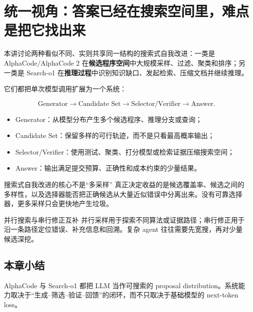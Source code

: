 \section{统一视角：答案已经在搜索空间里，难点是把它找出来}

本讲讨论两种看似不同、实则共享同一结构的搜索式自我改进：一类是 AlphaCode/AlphaCode 2 在\textbf{候选程序空间}中大规模采样、过滤、聚类和排序；另一类是 Search-o1 在\textbf{推理过程}中识别知识缺口、发起检索、压缩文档并继续推理。

它们都把单次模型调用扩展为一个系统：

$$
\text{Generator}\rightarrow \text{Candidate Set}\rightarrow
\text{Selector/Verifier}\rightarrow \text{Answer}.
$$

\begin{itemize}
    \item Generator：从模型分布产生多个候选程序、推理分支或查询；
    \item Candidate Set：保留多样的可行轨迹，而不是只看最高概率输出；
    \item Selector/Verifier：使用测试、聚类、打分模型或检索证据压缩搜索空间；
    \item Answer：输出满足提交预算、正确性和成本约束的少量结果。
\end{itemize}

\begin{importantbox}{搜索式自我改进的核心不是“多采样”}
真正决定收益的是候选覆盖率、候选之间的多样性，以及选择器能否把正确候选从大量近似错误中分离出来。没有可靠选择器，更多采样只会更快地产生垃圾。
\end{importantbox}

\begin{knowledgebox}{并行搜索与串行修正互补}
并行采样用于探索不同算法或证据路径；串行修正用于沿一条路径定位错误、补充信息和回溯。复杂 agent 往往需要先宽搜，再对少量候选深挖。
\end{knowledgebox}

\subsection{本章小结}

AlphaCode 与 Search-o1 都把 LLM 当作可搜索的 proposal distribution。系统能力取决于“生成--筛选--验证--回馈”的闭环，而不只取决于基础模型的 next-token loss。

